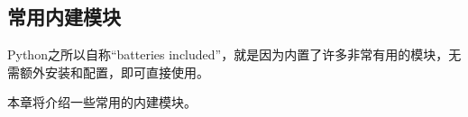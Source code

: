 \hypertarget{ux5e38ux7528ux5185ux5efaux6a21ux5757}{%
\subsection{常用内建模块}\label{ux5e38ux7528ux5185ux5efaux6a21ux5757}}

Python之所以自称``batteries
included''，就是因为内置了许多非常有用的模块，无需额外安装和配置，即可直接使用。

本章将介绍一些常用的内建模块。


